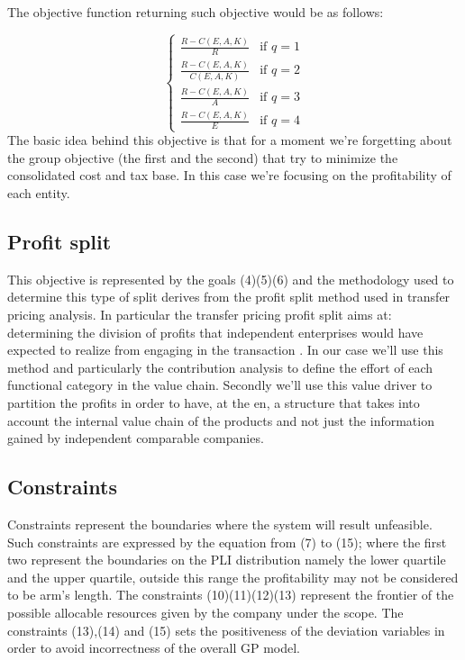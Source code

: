 \documentclass{article}
\begin{document}
The objective function returning such objective would be as follows:

\[
\begin{cases}
   \frac{R - C(E,A,K)}{R} & \text{if } q=1
   \\
   \frac{R - C(E,A,K)}{C(E,A,K)} & \text{if } q=2
   \\
   \frac{R - C(E,A,K)}{A} & \text{if } q=3
   \\
   \frac{R - C(E,A,K)}{E} & \text{if } q=4
\end{cases}
\]
The basic idea behind this objective is that for a moment we're forgetting about the group objective (the first and the second) that try to minimize the consolidated cost and tax base. In this case we're focusing on the profitability of each entity.

\subsection{Profit split}
This objective is represented by the goals (4)(5)(6) and the methodology used to determine this type of split derives from the profit split method used in transfer pricing analysis. In particular the transfer pricing profit split aims at: determining the division of profits that independent enterprises would have expected to realize from engaging in the transaction \cite{OECD_ProfitSplit_2017}. In our case we'll use this method and particularly the contribution analysis to define the effort of each functional category in the value chain. Secondly we'll use this value driver to partition the profits in order to have, at the en, a structure that takes into account the internal value chain of the products and not just the information gained by independent comparable companies.


\subsection{Constraints}
Constraints represent the boundaries where the system will result unfeasible. Such constraints are expressed by the equation from (7) to (15); where the first two represent the boundaries on the PLI distribution namely the lower quartile and the upper quartile, outside this range the profitability may not be considered to be arm's length. The constraints (10)(11)(12)(13) represent the frontier of the possible allocable resources given by the company under the scope. The constraints (13),(14) and (15) sets the positiveness of the deviation variables in order to avoid incorrectness of the overall GP model.
\end{document}
